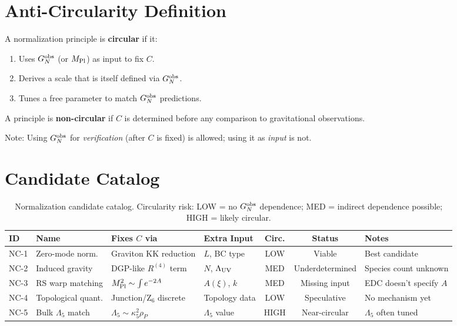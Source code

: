 \documentclass[11pt,a4paper]{article}
\begin{document}
\section{Anti-Circularity Definition}
\label{sec:circularity}

\begin{statusbox}
A normalization principle is \textbf{circular} if it:
\begin{enumerate}
\item Uses $G_N^{\rm obs}$ (or $M_{\rm Pl}$) as input to fix $C$.
\item Derives a scale that is itself defined via $G_N^{\rm obs}$.
\item Tunes a free parameter to match $G_N^{\rm obs}$ predictions.
\end{enumerate}
A principle is \textbf{non-circular} if $C$ is determined before any
comparison to gravitational observations.
\end{statusbox}

Note: Using $G_N^{\rm obs}$ for \textit{verification} (after $C$ is fixed)
is allowed; using it as \textit{input} is not.

\section{Candidate Catalog}
\label{sec:catalog}

\begin{table}[h]
\centering
\small
\begin{tabular}{llp{3.5cm}p{2.8cm}ccp{2.5cm}}
\toprule
\textbf{ID} & \textbf{Name} & \textbf{Fixes $C$ via} & \textbf{Extra Input} &
\textbf{Circ.} & \textbf{Status} & \textbf{Notes} \\
\midrule
NC-1 & Zero-mode norm. & Graviton KK reduction & $L$, BC type & LOW & Viable &
Best candidate \\
NC-2 & Induced gravity & DGP-like $R^{(4)}$ term & $N$, $\Lambda_{\rm UV}$ &
MED & Underdetermined & Species count unknown \\
NC-3 & RS warp matching & $M_{\rm Pl}^2 \sim \int e^{-2A}$ & $A(\xi)$, $k$ &
MED & Missing input & EDC doesn't specify $A$ \\
NC-4 & Topological quant. & Junction/Z$_6$ discrete & Topology data & LOW &
Speculative & No mechanism yet \\
NC-5 & Bulk $\Lambda_5$ match & $\Lambda_5 \sim \kappa_5^2 \rho_P$ &
$\Lambda_5$ value & HIGH & Near-circular & $\Lambda_5$ often tuned \\
\bottomrule
\end{tabular}
\caption{Normalization candidate catalog. Circularity risk:
LOW = no $G_N^{\rm obs}$ dependence;
MED = indirect dependence possible;
HIGH = likely circular.}
\label{tab:catalog}
\end{table}
\end{document}
